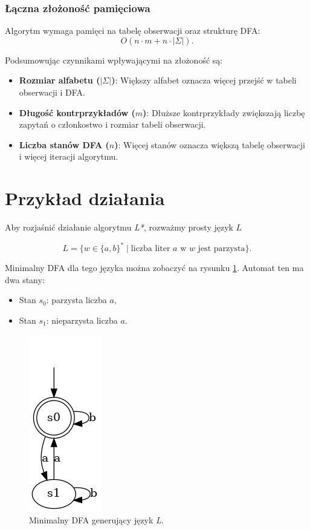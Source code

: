 \subsubsection*{Łączna złożoność pamięciowa}
Algorytm wymaga pamięci na tabelę obserwacji oraz strukturę DFA:
\[
O(n \cdot m + n \cdot |\Sigma|).
\]

Podsumowując czynnikami wpływającymi na złożoność są:
\begin{itemize}
    \item \textbf{Rozmiar alfabetu (\(|\Sigma|\))}: Większy alfabet oznacza więcej przejść w tabeli obserwacji i DFA.
    \item \textbf{Długość kontrprzykładów (\(m\))}: Dłuższe kontrprzykłady zwiększają liczbę zapytań o członkostwo i rozmiar tabeli obserwacji.
    \item \textbf{Liczba stanów DFA (\(n\))}: Więcej stanów oznacza większą tabelę obserwacji i więcej iteracji algorytmu.
\end{itemize}

\section{Przykład działania}

Aby rozjaśnić działanie algorytmu \textit{L*}, rozważmy prosty język \( L \)

\[
L = \{w \in \{a, b\}^* \mid \text{liczba liter } a \text{ w } w \text{ jest parzysta}\}.
\]

Minimalny DFA dla tego języka można zobaczyć na rysunku \ref{fig:dfa_even_a}. Automat ten ma dwa stany:
\begin{itemize}
    \item Stan \( s_0 \): parzysta liczba \( a \),
    \item Stan \( s_1 \): nieparzysta liczba \( a \).
\end{itemize}

\begin{figure}[ht]
    \centering
    \includegraphics[width=0.2\linewidth]{images/dfa_even_a.png}
    \caption{Minimalny DFA generujący język \textit{L}.}
    \label{fig:dfa_even_a}
\end{figure}

